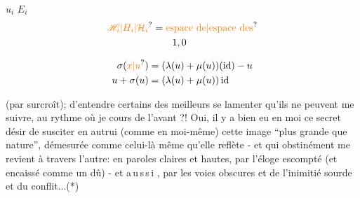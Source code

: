 $u_i$  $E_i$ 
\[
\begin{aligned}
\unsure{\mathscr H_i|H_i|\mathcal H_i}&=\text{\unsure{espace de|espace des}}\\
&\qquad 1,0
\end{aligned}
\]




\[
\begin{aligned}
\sigma(\unsure{x|u})&=(\lambda(u)+\mu(u))(\mathrm{id})-u\\
u+\sigma(u)&=(\lambda(u)+\mu(u))\,\mathrm{id}
\end{aligned}
\]


(par surcroît); d'entendre certains des meilleurs se lamenter qu'ils ne peuvent me suivre, au rythme où je cours de l'avant ?! Oui, il y a bien eu en moi ce secret désir de susciter en autrui (comme en moi-même) cette image ``plus grande que nature'', démesurée comme celui-là même qu'elle reflète - et qui obstinément me revient à travers l'autre: en paroles claires et hautes, par l'éloge escompté (et encaissé comme un dû) - et a\,u\,s\,s\,i , par les voies obscures et  de l'inimitié sourde et du conflit...(*)

